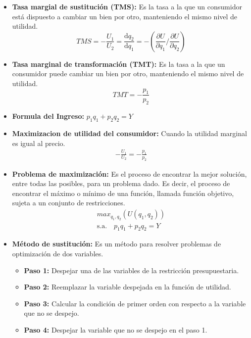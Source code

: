 \documentclass{templateNote}
\begin{document}
\begin{itemize}
    \item \textbf{Tasa margial de sustitución (TMS):} Es la tasa a la que un consumidor está dispuesto a cambiar un bien por otro, manteniendo el mismo nivel de utilidad.\\
    \begin{equation*}
        TMS =- \frac{U_1}{U_2} = \frac{\mathrm{d} q_2}{\mathrm{d} q_1} = - \left(\frac{\partial U}{\partial q_1} / \frac{\partial U}{\partial q_2}\right) 
    \end{equation*}

    \item \textbf{Tasa marginal de transformación (TMT):} Es la tasa a la que un consumidor puede cambiar un bien por otro, manteniendo el mismo nivel de utilidad.\\
    \begin{equation*}
        TMT =- \frac{p_1}{p_2}
    \end{equation*}

    \item \textbf{Formula del Ingreso:} $p_1 q_1 + p_2 q_2 = Y$
    
    \item \textbf{Maximizacion de utilidad del consumidor:} Cuando la utilidad marginal es igual al precio.
    \begin{align*}
        - \frac{U_1}{U_2} = - \frac{p_1}{p_2}
    \end{align*}
    
    \item \textbf{Problema de maximización:} Es el proceso de encontrar la mejor solución, entre todas las posibles, para un problema dado. Es decir, el proceso de encontrar el máximo o mínimo de una función, llamada función objetivo, sujeta a un conjunto de restricciones.
    \begin{align*}
        max_{q_1, q_2} (U(q_1,q_2)) \\
        \text{s.a.} \quad p_1 q_1 + p_2 q_2 = Y
    \end{align*}
    
    \item \textbf{Método de sustitución:} Es un método para resolver problemas de optimización de dos variables.\\
    \begin{itemize}
        \item \textbf{Paso 1:} Despejar una de las variables de la restricción presupuestaria.
        \item \textbf{Paso 2:} Reemplazar la variable despejada en la función de utilidad.
        \item \textbf{Paso 3:} Calcular la condición de primer orden con respecto a la variable que no se despejo.
        \item \textbf{Paso 4:} Despejar la variable que no se despejo en el paso 1.
    \end{itemize}


\end{itemize}
\end{document}
